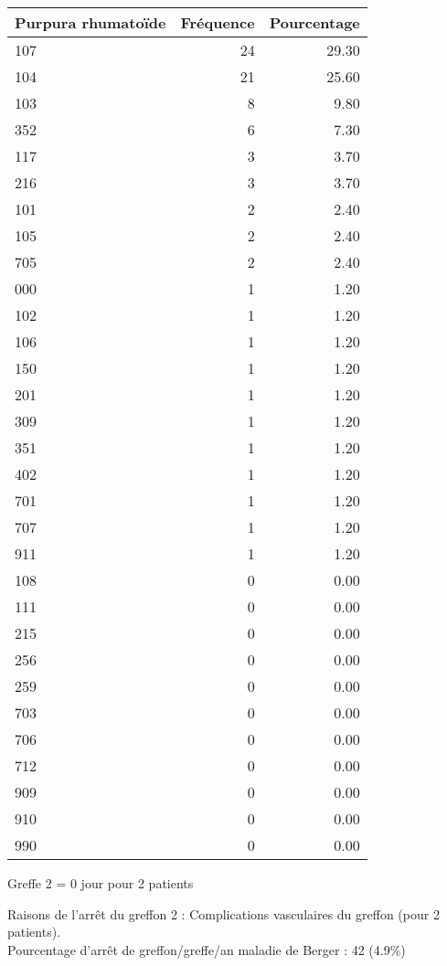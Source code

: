\documentclass[11pt,a4paper]{article}\usepackage[]{graphicx}\usepackage[]{color}
\begin{document}
\begin{table}[H]
\centering
\begin{tabular}{lrr}
  \hline
Purpura rhumatoïde & Fréquence & Pourcentage \\ 
  \hline
107 &  24 & 29.30 \\ 
  104 &  21 & 25.60 \\ 
  103 &   8 & 9.80 \\ 
  352 &   6 & 7.30 \\ 
  117 &   3 & 3.70 \\ 
  216 &   3 & 3.70 \\ 
  101 &   2 & 2.40 \\ 
  105 &   2 & 2.40 \\ 
  705 &   2 & 2.40 \\ 
  000 &   1 & 1.20 \\ 
  102 &   1 & 1.20 \\ 
  106 &   1 & 1.20 \\ 
  150 &   1 & 1.20 \\ 
  201 &   1 & 1.20 \\ 
  309 &   1 & 1.20 \\ 
  351 &   1 & 1.20 \\ 
  402 &   1 & 1.20 \\ 
  701 &   1 & 1.20 \\ 
  707 &   1 & 1.20 \\ 
  911 &   1 & 1.20 \\ 
  108 &   0 & 0.00 \\ 
  111 &   0 & 0.00 \\ 
  215 &   0 & 0.00 \\ 
  256 &   0 & 0.00 \\ 
  259 &   0 & 0.00 \\ 
  703 &   0 & 0.00 \\ 
  706 &   0 & 0.00 \\ 
  712 &   0 & 0.00 \\ 
  909 &   0 & 0.00 \\ 
  910 &   0 & 0.00 \\ 
  990 &   0 & 0.00 \\ 
   \hline
\end{tabular}
\end{table}


Greffe 2 = 0 jour pour 2 patients

Raisons de l'arrêt du greffon 2 : Complications vasculaires du greffon  (pour 2 patients).
~\\

Pourcentage d'arrêt de greffon/greffe/an maladie de Berger : 42 (4.9\%)
\end{document}
